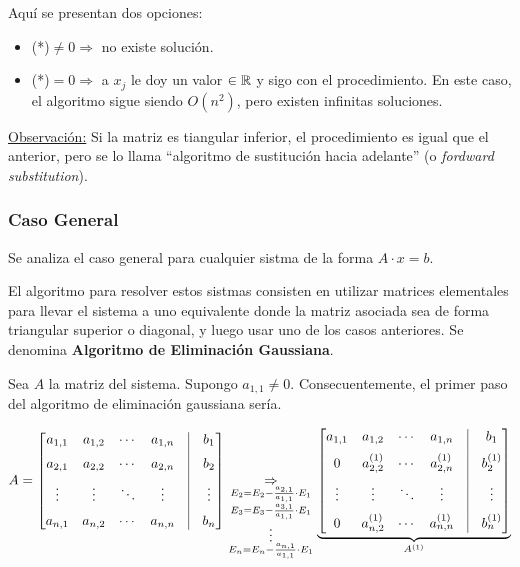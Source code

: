 \documentclass[]{article}
\begin{document}
\begin{itemize}
	Aquí se presentan dos opciones:
	\begin{itemize}
		\item (*)$ \neq 0 \Rightarrow$ no existe solución.
		\item (*)$=0 \Rightarrow$ a $x_j$ le doy un valor $\in \mathbb{R}$ y sigo con el procedimiento. En este caso, el algoritmo sigue siendo $O(n^2)$, pero existen infinitas soluciones.
	\end{itemize}
\end{itemize}

\underline{Observación:} Si la matriz es tiangular inferior, el procedimiento es igual que el anterior, pero se lo llama ``algoritmo de sustitución hacia adelante'' (o \textit{fordward substitution}).

\subsubsection{Caso General}
Se analiza el caso general para cualquier sistma de la forma $A\cdot x = b$.

El algoritmo para resolver estos sistmas consisten en utilizar matrices elementales para llevar el sistema a uno equivalente donde la matriz asociada sea de forma triangular superior o diagonal, y luego usar uno de los casos anteriores. Se denomina \textbf{Algoritmo de Eliminación Gaussiana}.


Sea $A$ la matriz del sistema. Supongo $a_{1,1}\neq0$. Consecuentemente, el primer paso del algoritmo de eliminación gaussiana sería.
\begin{center}
	$A =
	\begin{bmatrix}
		a_{1,1} & a_{1,2} & \cdots & a_{1,n} & \vrule & b_1\\[6pt]
		a_{2,1} & a_{2,2} & \cdots & a_{2,n} & \vrule & b_2\\[6pt]
		\vdots & \vdots & \ddots & \vdots & \vrule & \vdots\\[6pt]
		a_{n,1} & a_{n,2} & \cdots & a_{n,n} & \vrule & b_n
	\end{bmatrix} \underset{\substack{E_2 = E_2 - \frac{a_{2,1}}{a_{1,1}}\cdot E_1 \\ E_3 = E_3 - \frac{a_{3,1}}{a_{1,1}}\cdot E_1 \\ \vdots \\ E_n = E_n - \frac{a_{n,1}}{a_{1,1}}\cdot E_1}}{\Rightarrow}
	\underbrace{\displaystyle \begin{bmatrix}
		a_{1,1} & a_{1,2} & \cdots & a_{1,n} & \vrule & b_1\\[6pt]
		0 & a_{2,2}^{(1)} & \cdots & a_{2,n}^{(1)} & \vrule & b_2^{(1)}\\[6pt]
		\vdots & \vdots & \ddots & \vdots & \vrule & \vdots\\[6pt]
		0 & a_{n,2}^{(1)} & \cdots & a_{n,n}^{(1)} & \vrule & b_n^{(1)}
	\end{bmatrix}}_{A^{(1)} }
	$
\end{center}
\end{document}
